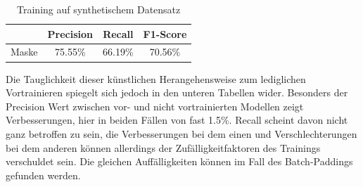 \begin{table}[H]
    \centering
    \begin{minipage}{0.475\textwidth}
        \centering
        \begin{tabular}{|l|c|c|c|}
            \hline
            \rowcolor[HTML]{EFEFEF}
                  & Precision & Recall  & F1-Score \\ \hline
            Maske & 75.55\%   & 66.19\% & 70.56\%  \\ \hline
        \end{tabular}
        \caption{Training auf synthetischem Datensatz}
    \end{minipage}%
\end{table}

Die Tauglichkeit dieser künstlichen Herangehensweise zum lediglichen Vortrainieren spiegelt sich jedoch in den unteren Tabellen wider. Besonders der Precision Wert zwischen vor- und nicht vortrainierten Modellen zeigt Verbesserungen, hier in beiden Fällen von fast 1.5\%. Recall scheint davon nicht ganz betroffen zu sein, die Verbesserungen bei dem einen und Verschlechterungen bei dem anderen können allerdings der Zufälligkeitfaktoren des Trainings verschuldet sein. Die gleichen Auffälligkeiten können im Fall des Batch-Paddings gefunden werden.

